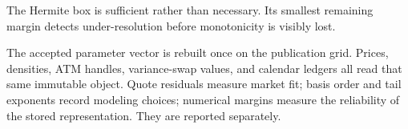 The Hermite box is sufficient rather than necessary.  Its smallest remaining
margin detects under-resolution before monotonicity is visibly lost.

The accepted parameter vector is rebuilt once on the publication grid.
Prices, densities, ATM handles, variance-swap values, and calendar ledgers all
read that same immutable object.  Quote residuals measure market fit; basis
order and tail exponents record modeling choices; numerical margins measure
the reliability of the stored representation.  They are reported separately.
